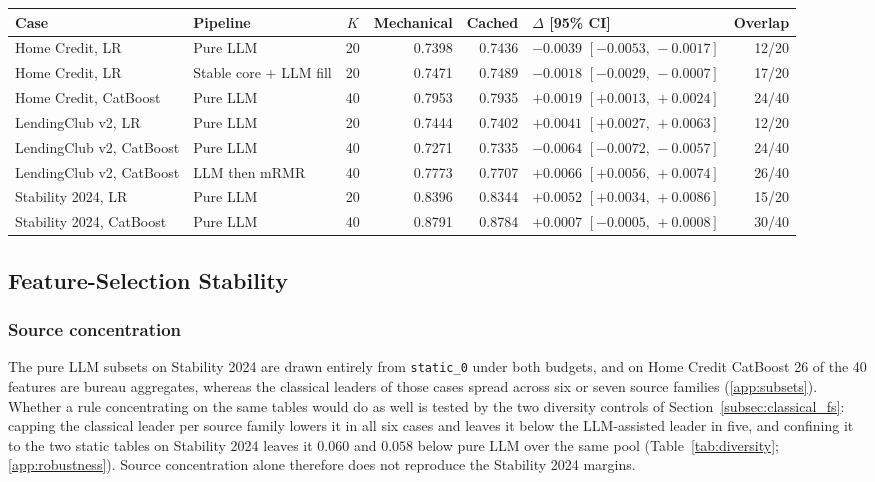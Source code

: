 \documentclass[final,5p,twocolumn]{elsarticle}
\newcommand{\Kfeat}{K}
\providecommand{\DIFaddtex}[1]{{\protect\color{blue} \sf #1}} %
\providecommand{\DIFdeltex}[1]{{\protect\color{red} \scriptsize #1}} %
\providecommand{\DIFaddbegin}{} %
\providecommand{\DIFdelbegin}{} %
\providecommand{\DIFdelend}{} %
\providecommand{\DIFaddendFL}{} %
\providecommand{\DIFadd}[1]{\texorpdfstring{\DIFaddtex{#1}}{#1}} %
\providecommand{\DIFdel}[1]{\texorpdfstring{\DIFdeltex{#1}}{}} %
\begin{document}
\begin{table}[htbp]
\begin{threeparttable}
\label{tab:mechanical}
\setlength{\tabcolsep}{5pt}
\begin{tabular}{@{}llcrrlr@{}}
\toprule
Case & Pipeline & $\Kfeat$ & Mechanical & Cached & $\Delta$ [95\% CI] & Overlap \\
\midrule
Home Credit, LR & Pure LLM & 20 & 0.7398 & 0.7436 & $-0.0039$ $[-0.0053,\,-0.0017]$ & 12/20 \\
Home Credit, LR & Stable core + LLM fill & 20 & 0.7471 & 0.7489 & $-0.0018$ $[-0.0029,\,-0.0007]$ & 17/20 \\
Home Credit, CatBoost & Pure LLM & 40 & 0.7953 & 0.7935 & $+0.0019$ $[+0.0013,\,+0.0024]$ & 24/40 \\
LendingClub v2, LR & Pure LLM & 20 & 0.7444 & 0.7402 & $+0.0041$ $[+0.0027,\,+0.0063]$ & 12/20 \\
LendingClub v2, CatBoost & Pure LLM & 40 & 0.7271 & 0.7335 & $-0.0064$ $[-0.0072,\,-0.0057]$ & 24/40 \\
LendingClub v2, CatBoost & LLM then mRMR & 40 & 0.7773 & 0.7707 & $+0.0066$ $[+0.0056,\,+0.0074]$ & 26/40 \\
Stability 2024, LR & Pure LLM & 20 & 0.8396 & 0.8344 & $+0.0052$ $[+0.0034,\,+0.0086]$ & 15/20 \\
Stability 2024, CatBoost & Pure LLM & 40 & 0.8791 & 0.8784 & $+0.0007$ $[-0.0005,\,+0.0008]$ & 30/40 \\
\bottomrule
\end{tabular}
\DIFaddendFL \end{threeparttable}
\end{table}

\DIFdelbegin \subsection{\DIFdel{Feature-Selection Stability}}
\addtocounter{subsection}{-1}%
\DIFdelend \DIFaddbegin \subsubsection{\DIFadd{Source concentration}}
\label{subsec:source_concentration}

\DIFadd{The pure LLM subsets on Stability 2024 are drawn entirely from \texttt{static\_0} under both budgets, and on Home Credit CatBoost 26 of the 40 features are bureau aggregates, whereas the classical leaders of those cases spread across six or seven source families (\ref{app:subsets}). Whether a rule concentrating on the same tables would do as well is tested by the two diversity controls of Section~\ref{subsec:classical_fs}: capping the classical leader per source family lowers it in all six cases and leaves it below the LLM-assisted leader in five, and confining it to the two static tables on Stability 2024 leaves it $0.060$ and $0.058$ below pure LLM over the same pool (Table~\ref{tab:diversity}; \ref{app:robustness}). Source concentration alone therefore does not reproduce the Stability 2024 margins.
}
\end{document}
